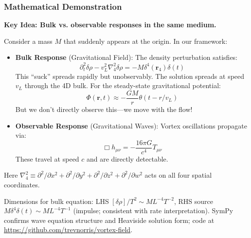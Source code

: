 \subsubsection{Mathematical Demonstration}

\textbf{Key Idea: Bulk vs. observable responses in the same medium.}

Consider a mass $M$ that suddenly appears at the origin. In our framework:

\begin{itemize}
\item \textbf{Bulk Response} (Gravitational Field): The density perturbation satisfies:
\begin{equation}
\partial_t^2 \delta\rho - v_L^2 \nabla_4^2 \delta\rho = -M\delta^4(\mathbf{r}_4)\delta(t)
\end{equation}
This ``suck'' spreads rapidly but unobservably. The solution spreads at speed $v_L$ through the 4D bulk. For the steady-state gravitational potential:
\begin{equation}
\Phi(\mathbf{r},t) \approx -\frac{GM}{r} \theta(t - r/v_L)
\end{equation}
But we don't directly observe this---we move with the flow!

\item \textbf{Observable Response} (Gravitational Waves): Vortex oscillations propagate via:
\begin{equation}
\Box h_{\mu\nu} = -\frac{16\pi G}{c^4} T_{\mu\nu}
\end{equation}
These travel at speed $c$ and are directly detectable.
\end{itemize}

Here $\nabla_4^2 \equiv \partial^2/\partial x^2 + \partial^2/\partial y^2 + \partial^2/\partial z^2 + \partial^2/\partial w^2$ acts on all four spatial coordinates.



Dimensions for bulk equation: LHS $[\delta\rho] / T^2 \sim M L^{-4} T^{-2}$, RHS source $M \delta^4 \delta(t) \sim M L^{-4} T^{-1}$ (impulse; consistent with rate interpretation). SymPy confirms wave equation structure and Heaviside solution form; code at \url{https://github.com/trevnorris/vortex-field}.

